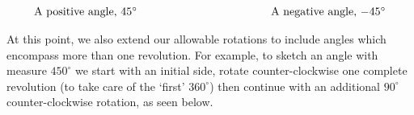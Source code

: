 \documentclass[12pt]{ximera}
\begin{document}
\[ \begin{array}{cc}



&

\hspace{1.5in}

 \\ 

\text{A positive angle, $45^{\circ}$} & \hspace{1.5in} \text{A negative angle, $-45^{\circ}$}

\end{array} \]

At this point, we also extend our allowable rotations to include angles which encompass more than one revolution.  For example, to sketch an angle with measure $450^{\circ}$ we start with an initial side, rotate counter-clockwise one complete revolution (to take care of the `first' $360^{\circ}$) then continue with an additional $90^{\circ}$ counter-clockwise rotation, as seen below.

\begin{center}

 

\end{center}
\end{document}
